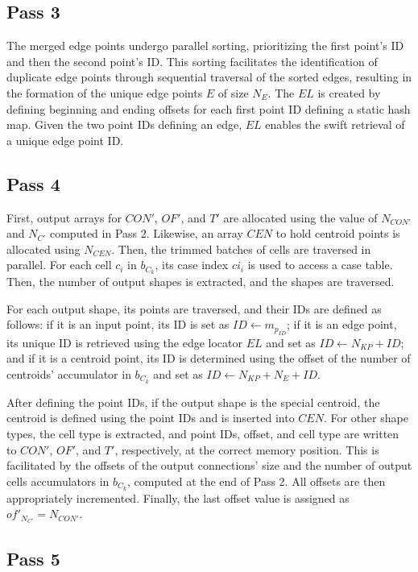 \documentclass{egpubl}
\begin{document}
\subsection{Pass 3}

The merged edge points undergo parallel sorting, prioritizing the first point's ID and then the second point's ID. This sorting facilitates the identification of duplicate edge points through sequential traversal of the sorted edges, resulting in the formation of the unique edge points $E$ of size $N_E$. The $EL$ is created by defining beginning and ending offsets for each first point ID defining a static hash map. Given the two point IDs defining an edge, $EL$  enables the swift retrieval of a unique edge point ID.

\subsection{Pass 4}

First, output arrays for $CON'$, $OF'$, and $T'$ are allocated using the value of $N_{CON'}$ and $N_{C'}$ computed in Pass 2. Likewise, an array $CEN$ to hold centroid points is allocated using $N_{CEN}$. Then, the trimmed batches of cells are traversed in parallel. For each cell $c_i$ in $b_{C_k}$, its case index $ci_i$ is used to access a case table. Then, the number of output shapes is extracted, and the shapes are traversed.

For each output shape, its points are traversed, and their IDs are defined as follows: if it is an input point, its ID is set as $ID \gets m_{p_{ID}}$; if it is an edge point, its unique ID is retrieved using the edge locator $EL$ and set as $ID \gets N_{KP} + ID$; and if it is a centroid point, its ID is determined using the offset of the number of centroids' accumulator in $b_{C_k}$ and set as $ID \gets N_{KP} + N_E + ID$.

After defining the point IDs, if the output shape is the special centroid, the centroid is defined using the point IDs and is inserted into $CEN$. For other shape types, the cell type is extracted, and point IDs, offset, and cell type are written to $CON'$, $OF'$, and $T'$, respectively, at the correct memory position. This is facilitated by the offsets of the output connections' size and the number of output cells accumulators in $b_{C_k}$, computed at the end of Pass 2. All offsets are then appropriately incremented. Finally, the last offset value is assigned as $of'_{N_{C'}} =N_{CON'}$.

\subsection{Pass 5}
\end{document}
